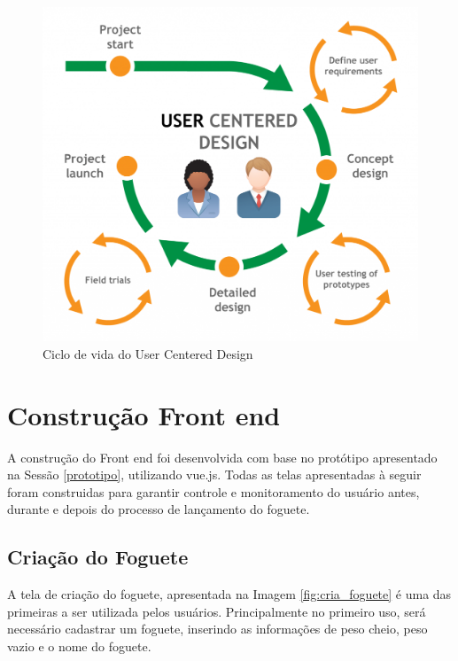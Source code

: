\begin{figure}[h!]
	\centering
		\includegraphics[keepaspectratio=true,scale=0.4]{figuras/UserCentered.png}
	\caption{Ciclo de vida do User Centered Design}
	\label{fig:ucer_centered_design_fig}
\end{figure}

\section{Construção Front end}

A construção do Front end foi desenvolvida com base no protótipo apresentado na Sessão \ref{prototipo}, utilizando vue.js. Todas as telas apresentadas à seguir foram construidas para garantir controle e monitoramento do usuário antes, durante e depois do processo de lançamento do foguete.


\subsection{Criação do Foguete}

A tela de criação do foguete, apresentada na Imagem \ref{fig:cria_foguete} é uma das primeiras a ser utilizada pelos usuários. Principalmente no primeiro uso, será necessário cadastrar um foguete, inserindo as informações de peso cheio, peso vazio e o nome do foguete. 

